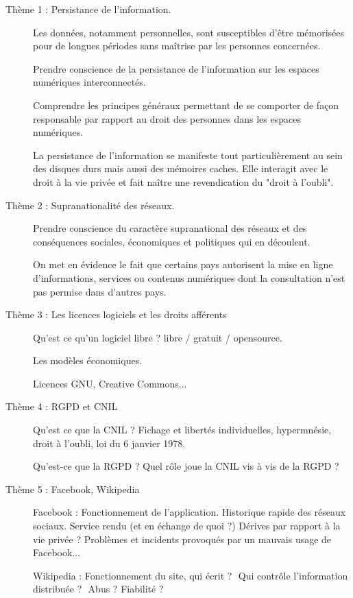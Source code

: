 \begin{description}
	\item[Thème 1 : Persistance de l'information.] 
	Les données, notamment personnelles, sont susceptibles d'être mémorisées pour de longues périodes sans maîtrise par les personnes concernées.

	Prendre conscience de la persistance de l'information sur les espaces numériques interconnectés.

	Comprendre les principes généraux permettant de se comporter de façon responsable par rapport au droit des personnes dans les espaces numériques.

	La persistance de l'information se manifeste tout particulièrement au sein des disques durs mais aussi des mémoires caches. Elle interagit avec le droit à la vie privée et fait naître une revendication du "droit à l'oubli".


	\item[Thème 2 : Supranationalité des réseaux.] 
	Prendre conscience du caractère supranational des réseaux et des conséquences sociales, économiques et politiques qui en découlent.

	On met en évidence le fait que certains pays autorisent la mise en ligne d'informations, services ou contenus numériques dont la consultation n'est pas permise dans d'autres pays.


	\item[Thème 3 : Les licences logiciels et les droits afférents] 
	Qu'est ce qu'un logiciel libre ? libre / gratuit / opensource.

	Les modèles économiques.

	Licences GNU, Creative Commons...


	\item[Thème 4 : RGPD et CNIL] 
	Qu'est ce que la CNIL ? Fichage et libertés individuelles, hypermnésie, droit à l'oubli, loi du 6 janvier 1978.
	
	Qu'est-ce que la RGPD ? Quel rôle joue la CNIL vis à vis de la RGPD ?


	\item[Thème 5 : Facebook, Wikipedia] 
	Facebook : Fonctionnement de l'application. Historique rapide des réseaux sociaux. Service rendu (et en échange de quoi ?) Dérives par rapport à la vie privée ? Problèmes et incidents provoqués par un mauvais usage de Facebook...

	Wikipedia : Fonctionnement du site,­ qui écrit ? ­ Qui contrôle l'information distribuée ? ­ Abus ? Fiabilité ?


\end{description}
